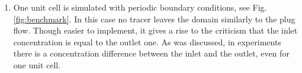 \documentclass{article}
\begin{document}
\begin{enumerate}
\item %
One unit
cell is simulated with
periodic boundary conditions, see Fig. \ref{fig:benchmark}. In this case no tracer leaves the
domain similarly to the plug flow. 
Though easier to implement, it gives a rise to the criticism
that the inlet concentration is equal to the outlet one. As was
discussed, in experiments there is a concentration difference between the
inlet and the outlet, even for one unit cell.


\end{enumerate}
\end{document}
